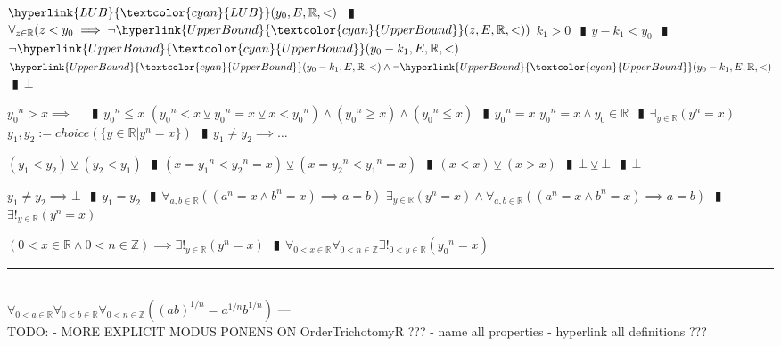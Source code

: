 \documentclass{book}
\newcommand{\wff}[1]{\hypertarget{#1}{\fbox{\textcolor{red}{$#1$}}\phantom{--}}}
\newcommand{\rf}[1]{\hyperlink{#1}{\textcolor{cyan}{#1}}}
\newcommand{\abr}{:=}
\newcommand{\pipe}{$\phantom{(}\vrectangleblack\phantom{)}$}
\begin{document}
\begin{enumerate}
\begin{enumerate}
\begin{enumerate}
      \lit $\rf{LUB}(y_0, E, \mathbb{R}, <)$ \pipe $\forall_{z \in \mathbb{R}}(z < y_0 \implies \lnot \rf{UpperBound}(z, E, \mathbb{R}, <))$
      \lit $k_1 > 0$ \pipe $y - k_1 < y_0$ \pipe $\lnot \rf{UpperBound}(y_0 - k_1, E, \mathbb{R}, <)$
      \lit $\rf{UpperBound}(y_0 - k_1, E, \mathbb{R}, <) \land \lnot \rf{UpperBound}(y_0 - k_1, E, \mathbb{R}, <)$ \pipe $\bot$
    \end{enumerate}
    \lit ${y_0}^n > x \implies \bot$ \pipe ${y_0}^n \leq x$
    \lit $({y_0}^n < x \veebar {y_0}^n = x \veebar x < {y_0}^n) \land( {y_0}^n \geq x) \land ({y_0}^n \leq x)$ \pipe ${y_0}^n = x$
    \lit ${y_0}^n = x \land y_0 \in \mathbb{R}$ \pipe $\exists_{y \in \mathbb{R}}(y^n = x)$
    \lit $y_1, y_2 \abr choice(\{y \in \mathbb{R} | y^n = x\})$ \pipe $y_1 \neq y_2 \implies \ldots$
    \begin{enumerate}
      \lit $(y_1 < y_2) \veebar (y_2 < y_1)$ \pipe $(x = {y_1}^n < {y_2}^n = x) \veebar (x = {y_2}^n < {y_1}^n = x)$ \pipe $(x < x) \veebar (x > x)$ \pipe $\bot \veebar \bot$ \pipe $\bot$
    \end{enumerate}
    \lit $y_1 \neq y_2 \implies \bot$ \pipe $y_1 = y_2$ \pipe $\forall_{a, b \in \mathbb{R}}((a^n = x \land b^n = x) \implies a = b)$
    \lit $\exists_{y \in \mathbb{R}}(y^n = x) \land \forall_{a, b \in \mathbb{R}}((a^n = x \land b^n = x) \implies a = b)$ \pipe $\exists!_{y \in \mathbb{R}}(y^n = x)$
  \end{enumerate}
  \lit $(0 < x \in \mathbb{R} \land 0 < n \in \mathbb{Z}) \implies \exists!_{y \in \mathbb{R}}(y^n = x)$ \pipe $\forall_{0 < x \in \mathbb{R}} \forall_{0 < n \in \mathbb{Z}} \exists!_{0 < y \in \mathbb{R}}({y_0}^n = x)$
\end{enumerate} \vspace{.75mm} \hrule \vspace{.75mm} \ \\ 

\wff{RootExistenceInRCorollary} $\forall_{0 < a \in \mathbb{R}} \forall_{0 < b \in \mathbb{R}} \forall_{0 < n \in \mathbb{Z}}((a b)^{1 / n} = a^{1 / n} b^{1 / n})$    \phantom{TODO}--- \\













TODO:
- MORE EXPLICIT MODUS PONENS ON OrderTrichotomyR ???
- name all properties
- hyperlink all definitions ???
\end{document}
